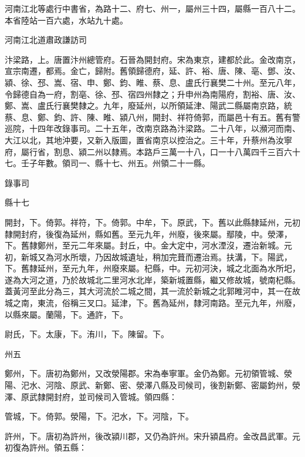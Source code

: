 \begin{pinyinscope}
 河南江北等處行中書省，為路十二、府七、州一，屬州三十四，屬縣一百八十二。本省陸站一百六處，水站九十處。



 河南江北道肅政謙訪司



 汴梁路，上。唐置汴州總管府。石晉為開封府。宋為東京，建都於此。金改南京，宣宗南遷，都焉。金亡，歸附。舊領歸德府，延、許、裕、唐、陳、亳、鄧、汝、潁、徐、邳、嵩、宿、申、鄭、鈞、睢、蔡、息、盧氏行襄樊二十州。至元八年，令歸德自為一府，割亳、徐、邳、宿四州隸之；升申州為南陽府，割裕、唐、汝、鄭、嵩、盧氏行襄樊隸之。九年，廢延州，以所領延津、陽武二縣屬南京路，統蔡、息、鄭、鈞、許、陳、睢、潁八州，開封、祥符倚郭，而屬邑十有五。舊有警巡院，十四年改錄事司。二十五年，改南京路為汴梁路。二十八年，以瀕河而南、大江以北，其地沖要，又新入版圖，置省南京以控治之。三十年，升蔡州為汝寧府，屬行省，割息、潁二州以隸焉。本路戶三萬一十八，口一十八萬四千三百六十七。壬子年數。領司一、縣十七、州五。州領二十一縣。



 錄事司



 縣十七



 開封，下。倚郭。祥符，下。倚郭。中牟，下。原武，下。舊以此縣隸延州，元初隸開封府，後復為延州，縣如舊。至元九年，州廢，後來屬。鄢陵，中。滎澤，下。舊隸鄭州，至元二年來屬。封丘，中。金大定中，河水湮沒，遷治新城。元初，新城又為河水所壞，乃因故城遺址，稍加完葺而遷治焉。扶溝，下。陽武，下。舊隸延州，至元九年，州廢來屬。杞縣，中。元初河決，城之北面為水所圯，遂為大河之道，乃於故城北二里河水北岸，築新城置縣，繼又修故城，號南杞縣。蓋黃河至此分為三，其大河流於二城之間，其一流於新城之北郭睢河中，其一在故城之南，東流，俗稱三叉口。延津，下。舊為延州，隸河南路。至元九年，州廢，以縣來屬。蘭陽，下。通許，下。



 尉氏，下。太康，下。洧川，下。陳留。下。



 州五



 鄭州，下。唐初為鄭州，又改滎陽郡。宋為奉寧軍。金仍為鄭。元初領管城、滎陽、汜水、河陰、原武、新鄭、密、滎澤八縣及司候司，後割新鄭、密屬鈞州，滎澤、原武隸開封府，並司候司入管城。領四縣：



 管城，下。倚郭。滎陽，下。汜水，下。河陰，下。



 許州，下。唐初為許州，後改潁川郡，又仍為許州。宋升潁昌府。金改昌武軍。元初復為許州。領五縣：




\end{pinyinscope}

